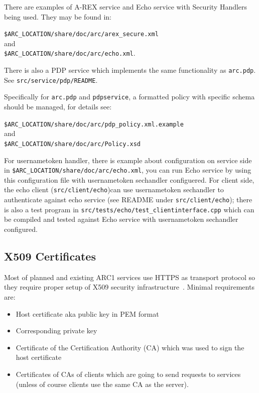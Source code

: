 \documentclass{article}                            %
\begin{document}
There are examples of A-REX service and Echo service with Security Handlers
being used. They may be found in:

\verb|$ARC_LOCATION/share/doc/arc/arex_secure.xml| \\and\\
\verb|$ARC_LOCATION/share/doc/arc/echo.xml|.

There is also a PDP service which implements the same functionality as
\texttt{arc.pdp}. See \texttt{src/service/pdp/README}.

Specifically for \texttt{arc.pdp} and \texttt{pdpservice}, a formatted policy
with specific schema should be managed, for details see:

\verb|$ARC_LOCATION/share/doc/arc/pdp_policy.xml.example| \\and\\
\verb|$ARC_LOCATION/share/doc/arc/Policy.xsd|

For usernametoken handler, there is example about configuration on service side
in \verb|$ARC_LOCATION/share/doc/arc/echo.xml|, you can run Echo service by
using this configuration file with usernametoken sechandler configuered. For
client side, the echo client (\texttt{src/client/echo})can use usernametoken
sechandler to authenticate against echo service (see README under
\verb|src/client/echo|); there is also a test program in
\verb|src/tests/echo/test_clientinterface.cpp| which can be compiled and
tested against Echo service with usernametoken sechandler configured.

\subsection{X509 Certificates}
\label{sec:x509}

Most of  planned and existing ARC1 services use HTTPS as transport protocol so
they require proper setup of X509 security infrastructure~\cite{x509}. Minimal
requirements are:

\begin{itemize}
\item Host certificate aka public key in PEM format
\item Corresponding private key
\item Certificate of the Certification Authority (CA) which was used to sign
the host certificate
\item Certificates of CAs of clients which are going to send requests to
services (unless of course clients use the same CA as the server).
\end{itemize}
\end{document}

